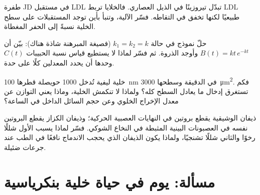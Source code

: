 \begin{exercise}[$\star\star$]\label{exo:b3:membrane-traffic:9}
طفرة JD في مستقبل LDL تبدّل تيروزينًا في الذيل
العصاري. فالخلايا تربط LDL طبيعيًا لكنها تخفق في التقاطه. فسّر
الآلية، وتنبأ بأين توجد المستقبلات على سطح الخلية
نسبةً إلى الحفر المغطاة.
\end{exercise}

\begin{exercise}[$\star\star\star$]\label{exo:b3:membrane-traffic:10}
حلّ نموذج  في حالة $k_{1} = k_{2} = k$ (فصيغة
المبرهنة شاذة هناك): بيّن أن $B(t) = kt\,e^{-kt}$
وأوجد الذروة. ثم فسّر لماذا لا يستطيع قياس نسبة الحبيبات
$C(t)$ وحدها أن يحدد المعدلين كلًا على حدة.
\end{exercise}

\begin{exercise}[$\star\star\star$]\label{exo:b3:membrane-traffic:11}
خلية ليفية تُدخل \num{1000} حويصلة  قطرها \qty{100}{nm}
في الدقيقة وسطحها \qty{3000}{\micro m^2}. فكم
تستغرق إدخال ما يعادل السطح كله؟ ولماذا لا تنكمش
الخلية، وماذا يعني التوازن عن معدل
الإخراج الخلوي وعن حجم السائل الداخل في الساعة؟
\end{exercise}

\begin{exercise}[$\star\star\star$]\label{exo:b3:membrane-traffic:12}
ذيفان الوشيقية يقطع بروتين  في النهايات العصبية الحركية؛ وذيفان
الكزاز يقطع البروتين نفسه في العصبونات البينية المثبطة في النخاع
الشوكي. فسّر لماذا يسبب الأول شللًا رخوًا والثاني شللًا
تشنجيًا، ولماذا يكون الذيفان الذي يحجب الاندماج نافعًا في الطب عند
جرعات ضئيلة.
\end{exercise}

\section{مسألة: يوم في حياة خلية بنكرياسية}

